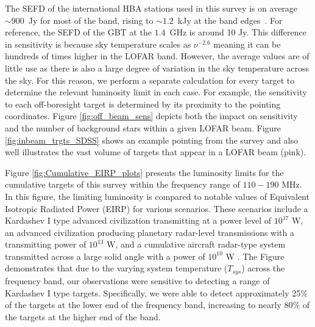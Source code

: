 The SEFD of the international HBA stations used in this survey is on average $\sim 900$~Jy for most of the band, rising to $\sim 1.2$~kJy at the band edges~\citep{2013arXiv1305.3550V}. For reference, the SEFD of the GBT at the $1.4$~GHz is around 10 Jy. This difference in sensitivity is 
because sky temperature scales as $\nu^{-2.6}$ meaning it can be hundreds of times higher in the LOFAR band. However, the average values are of little use as there is also a large degree of variation in the sky temperature across the sky. For this reason, we perform a separate calculation for every target to determine the relevant luminosity limit in each case.  For example, the sensitivity to each off-boresight target is determined by its proximity to the pointing coordinates. Figure \ref{fig:off_beam_sens} depicts both the impact on sensitivity and the number of background stars within a given LOFAR beam. Figure \ref{fig:inbeam_trgts_SDSS} shows an example pointing from the survey and also well illustrates the vast volume of targets that appear in a LOFAR beam (pink).


Figure \ref{fig:Cumulative_EIRP_plots} presents the luminosity limits for the cumulative targets of this survey within the frequency range of $110-190$ MHz. In this figure, the limiting luminosity is compared to notable values of Equivalent Isotropic Radiated Power (EIRP) for various scenarios. These scenarios include a Kardashev I type advanced civilization transmitting at a power level of $10^{17}$ W, an advanced civilization producing planetary radar-level transmissions with a transmitting power of $10^{13}$ W, and a cumulative aircraft radar-type system transmitted across a large solid angle with a power of $10^{10}$ W \citep{Siemion_KEPLER_ApJ}. The Figure demonstrates that due to the varying system temperature ($T_{sys}$) across the frequency band, our observations were sensitive to detecting a range of Kardashev I type targets. Specifically, we were able to detect approximately 25\% of the targets at the lower end of the frequency band, increasing to nearly 80\% of the targets at the higher end of the band.


